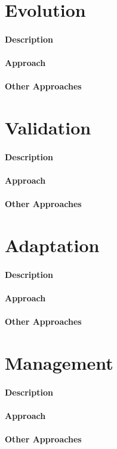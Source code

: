 \section{Evolution} %
\label{sec:evolution}

\paragraph{Description}
\paragraph{Approach}
\paragraph{Other Approaches}

\section{Validation} %
\label{sec:validation}

\paragraph{Description}
\paragraph{Approach}
\paragraph{Other Approaches}

\section{Adaptation} %
\label{sec:adaptation}

\paragraph{Description}
\paragraph{Approach}
\paragraph{Other Approaches}

\section{Management} %
\label{sec:management}

\paragraph{Description}
\paragraph{Approach}
\paragraph{Other Approaches}